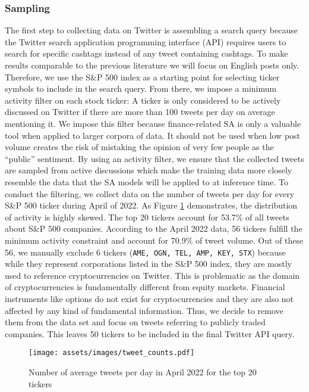 \subsubsection{Sampling}
\label{section-sampling}
The first step to collecting data on Twitter is assembling a search query because the Twitter search application programming interface (API) requires users to search for specific cashtags instead of any tweet containing cashtags. To make results comparable to the previous literature we will focus on English posts only. Therefore, we use the S\&P 500 index as a starting point for selecting ticker symbols to include in the search query. From there, we impose a minimum activity filter on each stock ticker: A ticker is only considered to be actively discussed on Twitter if there are more than 100 tweets per day on average mentioning it. We impose this filter because finance-related SA is only a valuable tool when applied to larger corpora of data. It should not be used when low post volume creates the risk of mistaking the opinion of very few people as the ``public'' sentiment. By using an activity filter, we ensure that the collected tweets are sampled from active discussions which make the training data more closely resemble the data that the SA models will be applied to at inference time. To conduct the filtering, we collect data on the number of tweets per day for every S\&P 500 ticker during April of 2022. As Figure \ref{figure-tweet-activity} demonstrates, the distribution of activity is highly skewed. The top 20 tickers account for 53.7\% of all tweets about S\&P 500 companies. According to the April 2022 data, 56 tickers fulfill the minimum activity constraint and account for 70.9\% of tweet volume. Out of these 56, we manually exclude 6 tickers (\texttt{AME, OGN, TEL, AMP, KEY, STX}) because while they represent corporations listed in the S\&P 500 index, they are mostly used to reference cryptocurrencies on Twitter. This is problematic as the domain of cryptocurrencies is fundamentally different from equity markets. Financial instruments like options do not exist for cryptocurrencies and they are also not affected by any kind of fundamental information. Thus, we decide to remove them from the data set and focus on tweets referring to publicly traded companies. This leaves 50 tickers to be included in the final Twitter API query.

\begin{figure}[!ht]
	\texttt{[image: assets/images/tweet\_counts.pdf]}
	\caption{Number of average tweets per day in April 2022 for the top 20 tickers}
	\label{figure-tweet-activity}
\end{figure}

